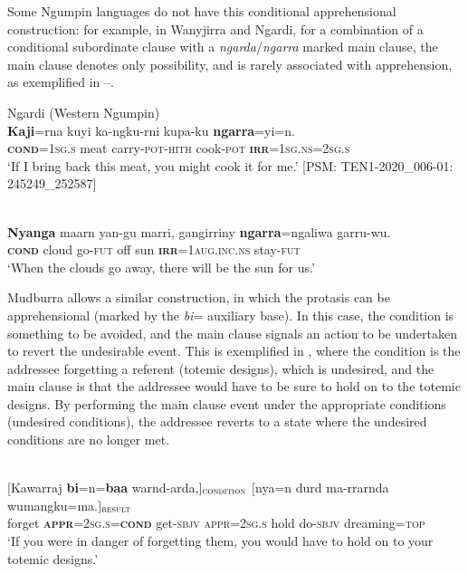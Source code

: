 \documentclass[output=paper,colorlinks,citecolor=brown]{langscibook}
\begin{document}
 Some Ngumpin languages do not have this conditional apprehensional construction: for example, in Wanyjirra and Ngardi, for a combination of a conditional subordinate clause with a \textit{ngarda}/\textit{ngarra} marked main clause, the main clause denotes only possibility, and is rarely associated with apprehension, as exemplified in --.

\ea 
\textnormal{Ngardi (Western Ngumpin)} \\
\gll \textbf{Kaji}=rna kuyi ka-ngku-rni kupa-ku \textbf{ngarra}=yi=n. \\
\textsc{\textbf{cond}=1sg.s} meat carry-\textsc{pot-hith} cook-\textsc{pot} \textsc{\textbf{irr}=1sg.ns=2sg.s} \\
\glt `If I bring back this meat, you might cook it for me.' [PSM: TEN1-2020\_006-01: 245249\_252587]
\label{ex:bro79}
\z

\ea 
{} \\
\gll \textbf{Nyanga} maarn yan-gu marri, gangirriny \textbf{ngarra}=ngaliwa garru-wu. \\
\textsc{\textbf{cond}} cloud go-\textsc{fut} off sun \textsc{\textbf{irr}=1aug.inc.ns} stay-\textsc{fut} \\
\glt `When the clouds go away, there will be the sun for us.'
\label{ex:bro80}
\z


 Mudburra allows a similar construction, in which the protasis can be apprehensional (marked by the \textit{bi}= auxiliary base). In this case, the condition is something to be avoided, and the main clause signals an action to be undertaken to revert the undesirable event. This is exemplified in , where the condition is the addressee forgetting a referent (totemic designs), which is undesired, and the main clause is that the addressee would have to be sure to hold on to the totemic designs. By performing the main clause event under the appropriate conditions (undesired conditions), the addressee reverts to a state where the undesired conditions are no longer met.


\ea 
{} \\
\gll $[$Kawarraj \textbf{bi}=n=\textbf{baa} {warnd-arda,$]{_\textnormal{\textsc{condition}}}$ \hspace*{2cm}} $[$nya=n durd ma-rrarnda wumangku=ma.$]{_\textnormal{\textsc{result}}}$ \\
forget \textsc{\textbf{appr}=2sg.s=\textbf{cond}} get-\textsc{sbjv} \textsc{appr=2sg.s} hold do-\textsc{sbjv} dreaming=\textsc{top} \\
\glt `If you were in danger of forgetting them, you would have to hold on to your totemic designs.'
\label{ex:bro81}
\z
\end{document}
